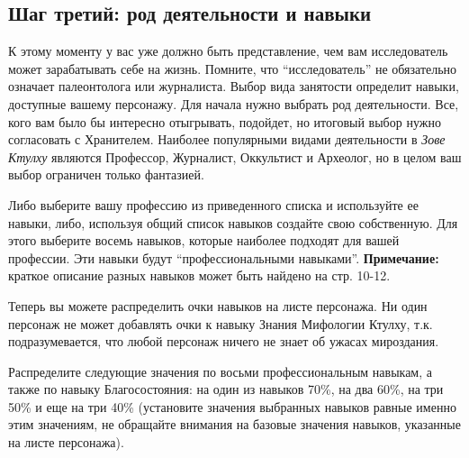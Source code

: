 \documentclass[letterpaper,twocolumn,openany, twoside, 11pt, usenames]{cocbook}
\begin{document}
\subsection*{Шаг третий: род деятельности и навыки}

К этому моменту у вас уже должно быть представление, чем вам исследователь может зарабатывать себе на жизнь. Помните, что ``исследователь'' не обязательно означает палеонтолога или журналиста. Выбор вида занятости определит навыки, доступные вашему персонажу. Для начала нужно выбрать род деятельности. Все, кого вам было бы интересно отыгрывать, подойдет, но итоговый выбор нужно согласовать с Хранителем. Наиболее популярными видами деятельности в {\it Зове Ктулху} являются Профессор, Журналист, Оккультист и Археолог, но в целом ваш выбор ограничен только фантазией.

Либо выберите вашу профессию из приведенного списка и используйте ее навыки, либо, используя общий список навыков создайте свою собственную. Для этого выберите восемь навыков, которые наиболее подходят для вашей профессии. Эти навыки будут ``профессиональными навыками''.
\smallbreak
\noindent \textbf{Примечание:} краткое описание разных навыков может быть найдено на стр. 10-12.
\smallbreak

Теперь вы можете распределить очки навыков на листе персонажа. Ни один персонаж не может добавлять очки к навыку Знания Мифологии Ктулху, т.к. подразумевается, что любой персонаж ничего не знает об ужасах мироздания.

Распределите следующие значения по восьми профессиональным навыкам, а также по навыку Благосостояния: на один из навыков 70\%, на два 60\%, на три 50\% и еще на три 40\% (установите значения выбранных навыков равные именно этим значениям, не обращайте внимания на базовые значения навыков, указанные на листе персонажа).

\smallbreak

\noindent {}
\end{document}
